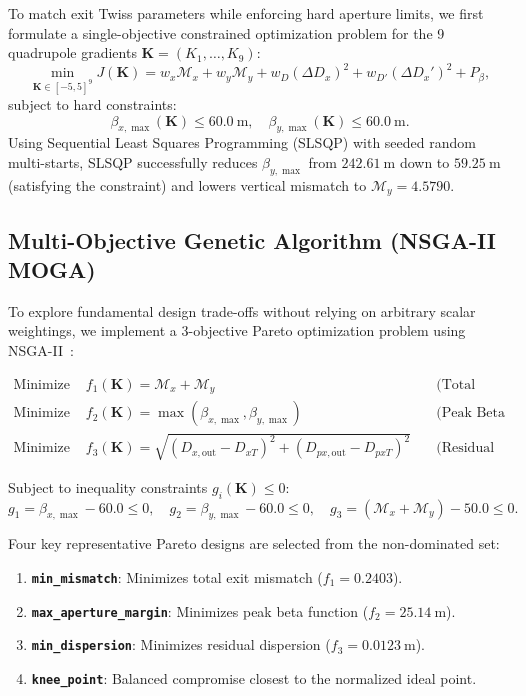\documentclass[a4paper,11pt]{article}
\begin{document}
To match exit Twiss parameters while enforcing hard aperture limits, we first formulate a single-objective constrained optimization problem for the 9 quadrupole gradients $\mathbf{K} = (K_1, \dots, K_9)$:
\begin{equation}
\min_{\mathbf{K} \in [-5, 5]^9} J(\mathbf{K}) = w_x \mathcal{M}_x + w_y \mathcal{M}_y + w_D (\Delta D_x)^2 + w_{D'} (\Delta D_x')^2 + P_\beta,
\end{equation}
subject to hard constraints:
\begin{equation}
\beta_{x,\max}(\mathbf{K}) \le 60.0~\mathrm{m}, \quad \beta_{y,\max}(\mathbf{K}) \le 60.0~\mathrm{m}.
\end{equation}
Using Sequential Least Squares Programming (SLSQP) with seeded random multi-starts, SLSQP successfully reduces $\beta_{y,\max}$ from $242.61~\mathrm{m}$ down to $59.25~\mathrm{m}$ (satisfying the constraint) and lowers vertical mismatch to $\mathcal{M}_y = 4.5790$.

\subsection{Multi-Objective Genetic Algorithm (NSGA-II MOGA)}

To explore fundamental design trade-offs without relying on arbitrary scalar weightings, we implement a 3-objective Pareto optimization problem using NSGA-II~\cite{NSGA2_2002, Pymoo_2020}:

\begin{align}
\text{Minimize } & f_1(\mathbf{K}) = \mathcal{M}_x + \mathcal{M}_y \quad &\text{(Total Optical Mismatch)} \\
\text{Minimize } & f_2(\mathbf{K}) = \max\left(\beta_{x,\max}, \beta_{y,\max}\right) \quad &\text{(Peak Beta / Aperture Risk)} \\
\text{Minimize } & f_3(\mathbf{K}) = \sqrt{(D_{x,\text{out}} - D_{xT})^2 + (D_{px,\text{out}} - D_{pxT})^2} \quad &\text{(Residual Dispersion)}
\end{align}

Subject to inequality constraints $g_i(\mathbf{K}) \le 0$:
\begin{equation}
g_1 = \beta_{x,\max} - 60.0 \le 0, \quad g_2 = \beta_{y,\max} - 60.0 \le 0, \quad g_3 = (\mathcal{M}_x + \mathcal{M}_y) - 50.0 \le 0.
\end{equation}

Four key representative Pareto designs are selected from the non-dominated set:
\begin{enumerate}
    \item \textbf{\texttt{min\_mismatch}}: Minimizes total exit mismatch ($f_1 = 0.2403$).
    \item \textbf{\texttt{max\_aperture\_margin}}: Minimizes peak beta function ($f_2 = 25.14~\mathrm{m}$).
    \item \textbf{\texttt{min\_dispersion}}: Minimizes residual dispersion ($f_3 = 0.0123~\mathrm{m}$).
    \item \textbf{\texttt{knee\_point}}: Balanced compromise closest to the normalized ideal point.
\end{enumerate}
\end{document}
